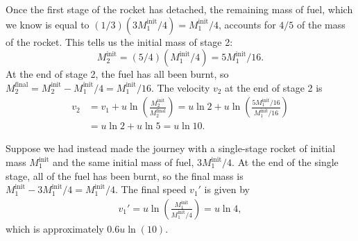 \documentclass[12pt]{article}
\begin{document}
\begin{enumerate}
  Once the first stage of the rocket has detached, the remaining mass of
  fuel, which we know is equal to
  $(1/3)(3M_1^{\text{init}}/4) = M_1^{\text{init}}/4$, accounts for
  $4/5$ of the mass of the rocket. This tells us the initial mass
  of stage 2:
  \begin{displaymath}
    M_2^{\text{init}} = (5/4)(M_1^{\text{init}}/4) =
    5M_1^{\text{init}}/16.
  \end{displaymath}
  At the end of stage 2, the fuel has all been burnt, so
  $M_2^{\text{final}} = M_2^{\text{init}} - M_1^{\text{init}}/4 =
  M_1^{\text{init}}/16$. The velocity $v_2$ at the end of stage 2 is
  \begin{align*}
    v_2 &= v_1 + u \ln \left (
      \frac{M_2^{\text{init}}}{M_2^{\text{final}}} \right ) 
    = u\ln 2 + u\ln \left
      ( \frac{5M_1^{\text{init}}/16}{M_1^{\text{init}}/16} \right ) \\
    &= u\ln 2 + u\ln 5 = u\ln 10.
  \end{align*}

  Suppose we had instead made the journey with a single-stage rocket of
  initial mass $M_1^{\text{init}}$ and the same initial mass of fuel,
  $3M_{1}^{\text{init}}/4$. At the end of the single stage, all of the
  fuel has been burnt, so the final mass is
  $M_1^{\text{init}} - 3M_{1}^{\text{init}}/4 = M_1^{\text{init}}/4$.
  The final speed $v_1'$ is given by
  \begin{align*}
    v_1' = u\ln\left ( \frac{M_1^{\text{init}}}{M_1^{\text{init}}/4}
    \right ) = u\ln 4,
  \end{align*}
  which is approximately $0.6u\ln(10)$.

    \end{enumerate}
    
\end{document}

